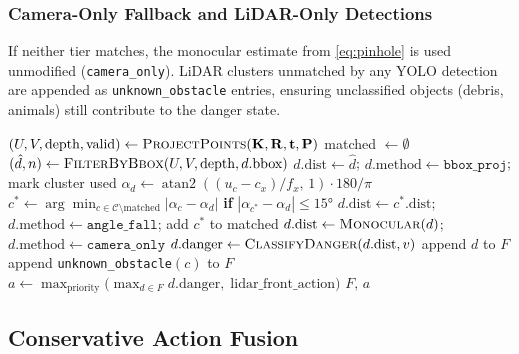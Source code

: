 \documentclass[12pt,a4paper]{article}
\begin{document}
\subsubsection{Camera-Only Fallback and LiDAR-Only Detections}

If neither tier matches, the monocular estimate from \cref{eq:pinhole} is
used unmodified (\texttt{camera\_only}).  LiDAR clusters unmatched by any
YOLO detection are appended as \texttt{unknown\_obstacle} entries, ensuring
unclassified objects (debris, animals) still contribute to the danger state.

\begin{algorithm}[H]
\caption{Two-Tier LiDAR--Camera Fusion Matching}
\label{alg:fusion_matching}
\begin{algorithmic}[1]
\State $(U,V,\text{depth},\text{valid}) \leftarrow
       \textsc{ProjectPoints}(\mathbf{K},\mathbf{R},\mathbf{t},\mathbf{P})$
\State matched $\leftarrow \emptyset$
  \State $(\hat{d},n) \leftarrow
         \textsc{FilterByBbox}(U,V,\text{depth},d.\text{bbox})$
    \State $d.\text{dist} \leftarrow \hat{d}$;\;
           $d.\text{method} \leftarrow \texttt{bbox\_proj}$;\;
           mark cluster used
  \Else
    \State $\alpha_d \leftarrow
           \operatorname{atan2}((u_c{-}c_x)/f_x,\,1)\!\cdot\!180/\pi$
    \State $c^* \!\leftarrow\! \arg\min_{c\in\mathcal{C}\setminus\text{matched}}
           |\alpha_c{-}\alpha_d|$\;
           \textbf{if} $|\alpha_{c^*}{-}\alpha_d|\!\le\!15°$
      \State $d.\text{dist} \leftarrow c^*\!.\text{dist}$;\;
             $d.\text{method} \leftarrow \texttt{angle\_fall}$;\;
             add $c^*$ to matched
    \Else
      \State $d.\text{dist} \leftarrow \textsc{Monocular}(d)$;\;
             $d.\text{method} \leftarrow \texttt{camera\_only}$
    \EndIf
  \EndIf
  \State $d.\text{danger} \leftarrow \textsc{ClassifyDanger}(d.\text{dist},v)$
  \State append $d$ to $F$
\EndFor
{}
  \State append \texttt{unknown\_obstacle}$(c)$ to $F$
\EndFor
\State $a \leftarrow
       \max_{\text{priority}}\bigl(
         \max_{d\in F} d.\text{danger},\;
         \text{lidar\_front\_action}\bigr)$
\State \Return $F,\,a$
\end{algorithmic}
\end{algorithm}

\subsection{Conservative Action Fusion}
\label{subsec:conservative_fusion}
\end{document}
